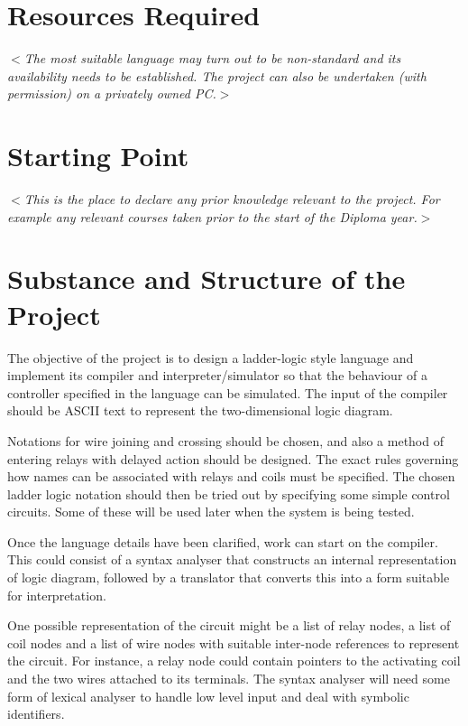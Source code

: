 \documentclass[12pt]{article}
\newcommand{\al}{$<$}
\newcommand{\ar}{$>$}
\begin{document}
\section*{Resources Required}

\al\emph{The most suitable language may turn out to be non-standard and
  its availability needs to be established.  The project can also be
  undertaken (with permission) on a privately owned PC.}\ar


\section*{Starting Point}

\al\emph{This is the place to declare any prior knowledge relevant to
  the project.  For example any relevant courses taken prior to the
  start of the Diploma year.}\ar


\section*{Substance and Structure of the Project}

The objective of the project is to design a ladder-logic style
language and implement its compiler and interpreter/simulator so that
the behaviour of a controller specified in the language can be
simulated.  The input of the compiler should be ASCII text to
represent the two-dimensional logic diagram.
 
Notations for wire joining and crossing should be chosen, and also a
method of entering relays with delayed action should be designed. The
exact rules governing how names can be associated with relays and
coils must be specified. The chosen ladder logic notation should then
be tried out by specifying some simple control circuits. Some of these
will be used later when the system is being tested.

Once the language details have been clarified, work can start on the
compiler.  This could consist of a syntax analyser that constructs an
internal representation of logic diagram, followed by a translator
that converts this into a form suitable for interpretation.

One possible representation of the circuit might be a list of relay
nodes, a list of coil nodes and a list of wire nodes with suitable
inter-node references to represent the circuit. For instance, a relay
node could contain pointers to the activating coil and the two wires
attached to its terminals. The syntax analyser will need some form of
lexical analyser to handle low level input and deal with symbolic
identifiers.
\end{document}
